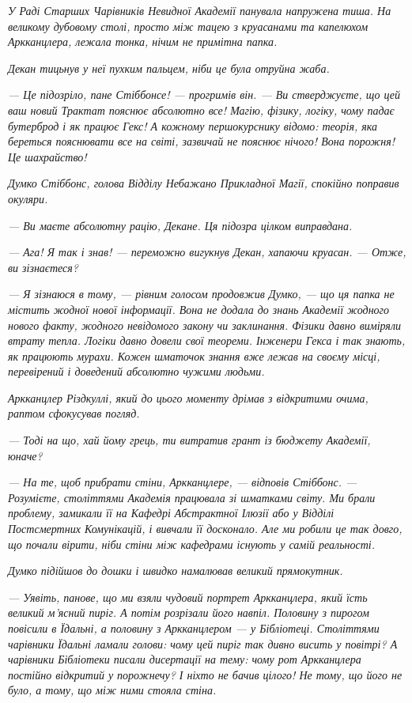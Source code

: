 \documentclass[12pt, a4paper, openany]{book}
\begin{document}
\begin{terrybox}
\textit{У Раді Старших Чарівників Невидної Академії панувала напружена тиша. На великому дубовому столі, просто між тацею з круасанами та капелюхом Аркканцлера, лежала тонка, нічим не примітна папка.}

\textit{Декан тицьнув у неї пухким пальцем, ніби це була отруйна жаба.}

\textit{--- Це підозріло, пане Стіббонсе! --- прогримів він. --- Ви стверджуєте, що цей ваш новий Трактат пояснює абсолютно все! Магію, фізику, логіку, чому падає бутерброд і як працює Гекс! А кожному першокурснику відомо: теорія, яка береться пояснювати все на світі, зазвичай не пояснює нічого! Вона порожня! Це шахрайство!}

\textit{Думко Стіббонс, голова Відділу Небажано Прикладної Магії, спокійно поправив окуляри.}

\textit{--- Ви маєте абсолютну рацію, Декане. Ця підозра цілком виправдана.}

\textit{--- Ага! Я так і знав! --- переможно вигукнув Декан, хапаючи круасан. --- Отже, ви зізнаєтеся?}

\textit{--- Я зізнаюся в тому, --- рівним голосом продовжив Думко, --- що ця папка не містить жодної нової інформації. Вона не додала до знань Академії жодного нового факту, жодного невідомого закону чи заклинання. Фізики давно виміряли втрату тепла. Логіки давно довели свої теореми. Інженери Гекса і так знають, як працюють мурахи. Кожен шматочок знання вже лежав на своєму місці, перевірений і доведений абсолютно чужими людьми.}

\textit{Аркканцлер Різдкуллі, який до цього моменту дрімав з відкритими очима, раптом сфокусував погляд.}

\textit{--- Тоді на що, хай йому грець, ти витратив грант із бюджету Академії, юначе?}

\textit{--- На те, щоб прибрати стіни, Аркканцлере, --- відповів Стіббонс. --- Розумієте, століттями Академія працювала зі шматками світу. Ми брали проблему, замикали її на Кафедрі Абстрактної Ілюзії або у Відділі Постсмертних Комунікацій, і вивчали її досконало. Але ми робили це так довго, що почали вірити, ніби стіни між кафедрами існують у самій реальності.}

\textit{Думко підійшов до дошки і швидко намалював великий прямокутник.}

\textit{--- Уявіть, панове, що ми взяли чудовий портрет Аркканцлера, який їсть великий м'ясний пиріг. А потім розрізали його навпіл. Половину з пирогом повісили в Їдальні, а половину з Аркканцлером --- у Бібліотеці. Століттями чарівники Їдальні ламали голови: чому цей пиріг так дивно висить у повітрі? А чарівники Бібліотеки писали дисертації на тему: чому рот Аркканцлера постійно відкритий у порожнечу? І ніхто не бачив цілого! Не тому, що його не було, а тому, що між ними стояла стіна.}


\end{terrybox}
\end{document}
